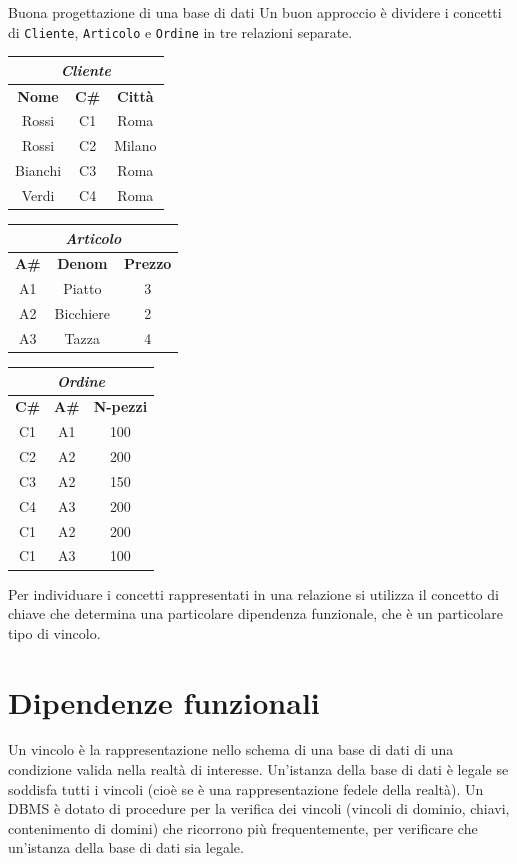 \begin{Example}{Buona progettazione di una base di dati}{}
    Un buon approccio è dividere i concetti di \verb|Cliente|, \verb|Articolo| e \verb|Ordine| in tre relazioni separate.
    \begin{center}
        \begin{tabular}{|c|c|c|}
            \hline\multicolumn{3}{|c|}{\textit{Cliente}}\\\hline
            \textbf{Nome} & \textbf{C\#} & \textbf{Città}\\\hline
            Rossi & C1 & Roma\\
            Rossi & C2 & Milano\\
            Bianchi & C3 & Roma\\
            Verdi & C4 & Roma\\\hline
        \end{tabular}
        \begin{tabular}{|c|c|c|}
            \hline\multicolumn{3}{|c|}{\textit{Articolo}}\\\hline
            \textbf{A\#} & \textbf{Denom} & \textbf{Prezzo}\\\hline
            A1 & Piatto & 3\\
            A2 & Bicchiere & 2\\
            A3 & Tazza & 4\\\hline
        \end{tabular}
         \begin{tabular}{|c|c|c|}
            \hline\multicolumn{3}{|c|}{\textit{Ordine}}\\\hline
            \textbf{C\#} & \textbf{A\#} & \textbf{N-pezzi}\\\hline
            C1 & A1 & 100\\
            C2 & A2 & 200\\
            C3 & A2 & 150\\
            C4 & A3 & 200\\
            C1 & A2 & 200\\
            C1 & A3 & 100\\\hline
        \end{tabular}
    \end{center}
\end{Example}

Per individuare i concetti rappresentati in una relazione si utilizza il concetto di chiave che determina una particolare dipendenza funzionale, che è un particolare tipo di vincolo.

\section{Dipendenze funzionali}
Un vincolo è la rappresentazione nello schema di una base di dati di una condizione valida nella realtà di interesse. Un'istanza della base di dati è legale se soddisfa tutti i vincoli (cioè se è una rappresentazione fedele della realtà).
Un DBMS è dotato di procedure per la verifica dei vincoli (vincoli di dominio, chiavi, contenimento di domini) che ricorrono più frequentemente, per verificare che un'istanza della base di dati sia legale.

